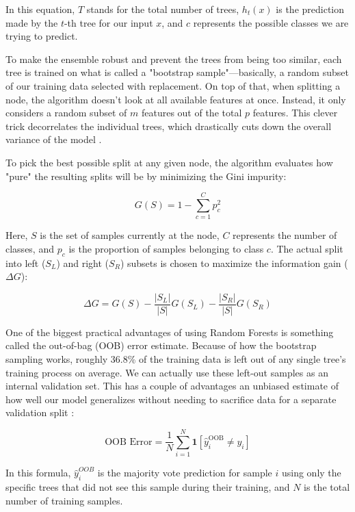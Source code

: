 \documentclass[
onecolumn,
]{ceurart}
\begin{document}
	In this equation, $T$ stands for the total number of trees, $h_{t}(x)$ is the prediction made by the $t$-th tree for our input $x$, and $c$ represents the possible classes we are trying to predict.
	
	
	To make the ensemble robust and prevent the trees from being too similar, each tree is trained on what is called a "bootstrap sample"—basically, a random subset of our training data selected with replacement. On top of that, when splitting a node, the algorithm doesn't look at all available features at once. Instead, it only considers a random subset of $m$ features out of the total $p$ features. This clever trick decorrelates the individual trees, which drastically cuts down the overall variance of the model \cite{breiman2001random}.
	
	
	To pick the best possible split at any given node, the algorithm evaluates how "pure" the resulting splits will be by minimizing the Gini impurity:
	
	\begin{equation}
		G(S) = 1 - \sum_{c=1}^{C} p_c^2
	\end{equation}
	
	
	Here, $S$ is the set of samples currently at the node, $C$ represents the number of classes, and $p_{c}$ is the proportion of samples belonging to class $c$. The actual split into left ($S_{L}$) and right ($S_{R}$) subsets is chosen to maximize the information gain ($\Delta G$):
	
	\begin{equation}
		\Delta G = G(S) - \frac{|S_L|}{|S|} G(S_L) - \frac{|S_R|}{|S|} G(S_R)
	\end{equation}
	
	
	One of the biggest practical advantages of using Random Forests is something called the out-of-bag (OOB) error estimate. Because of how the bootstrap sampling works, roughly 36.8\% of the training data is left out of any single tree's training process on average. We can actually use these left-out samples as an internal validation set. This has a couple of advantages an unbiased estimate of how well our model generalizes without needing to sacrifice data for a separate validation split \cite{breiman2001random}:
	
	\begin{equation}
		\text{OOB Error} = \frac{1}{N} \sum_{i=1}^{N} \mathbf{1}\left[\hat{y}_i^{\text{OOB}} \neq y_i\right]
	\end{equation}
	
	In this formula, $\hat{y}_{i}^{OOB}$ is the majority vote prediction for sample $i$ using only the specific trees that did not see this sample during their training, and $N$ is the total number of training samples.
	
\end{document}
